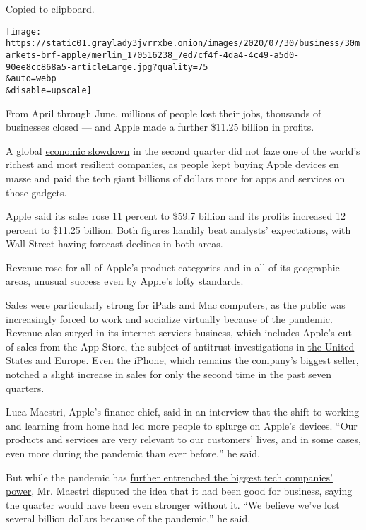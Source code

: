 Copied to clipboard.

\texttt{[image: https://static01.graylady3jvrrxbe.onion/images/2020/07/30/business/30markets-brf-apple/merlin\_170516238\_7ed7cf4f-4da4-4c49-a5d0-90ee8cc868a5-articleLarge.jpg?quality=75\\\&auto=webp\\\&disable=upscale]}

From April through June, millions of people lost their jobs, thousands
of businesses closed --- and Apple made a further \$11.25 billion in
profits.

A global
\href{https://www.nytimes3xbfgragh.onion/live/2020/07/30/business/stock-market-today-coronavirus/the-us-economys-contraction-in-the-second-quarter-was-the-worst-on-record}{economic
slowdown} in the second quarter did not faze one of the world's richest
and most resilient companies, as people kept buying Apple devices en
masse and paid the tech giant billions of dollars more for apps and
services on those gadgets.

Apple said its sales rose 11 percent to \$59.7 billion and its profits
increased 12 percent to \$11.25 billion. Both figures handily beat
analysts' expectations, with Wall Street having forecast declines in
both areas.

Revenue rose for all of Apple's product categories and in all of its
geographic areas, unusual success even by Apple's lofty standards.

Sales were particularly strong for iPads and Mac computers, as the
public was increasingly forced to work and socialize virtually because
of the pandemic. Revenue also surged in its internet-services business,
which includes Apple's cut of sales from the App Store, the subject of
antitrust investigations in
\href{https://www.nytimes3xbfgragh.onion/2020/07/28/technology/amazon-apple-facebook-google-antitrust-hearing.html}{the
United States} and
\href{https://www.nytimes3xbfgragh.onion/2020/06/16/business/apple-app-store-european-union-antitrust.html}{Europe}.
Even the iPhone, which remains the company's biggest seller, notched a
slight increase in sales for only the second time in the past seven
quarters.

Luca Maestri, Apple's finance chief, said in an interview that the shift
to working and learning from home had led more people to splurge on
Apple's devices. ``Our products and services are very relevant to our
customers' lives, and in some cases, even more during the pandemic than
ever before,'' he said.

But while the pandemic has
\href{https://www.nytimes3xbfgragh.onion/2020/03/23/technology/coronavirus-facebook-amazon-youtube.html}{further
entrenched the biggest tech companies' power}, Mr. Maestri disputed the
idea that it had been good for business, saying the quarter would have
been even stronger without it. ``We believe we've lost several billion
dollars because of the pandemic,'' he said.

